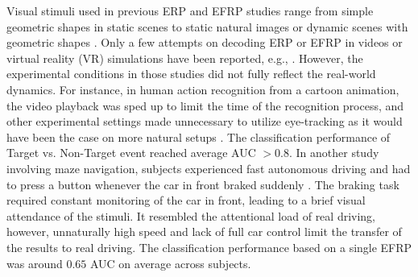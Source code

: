 \documentclass[12pt]{iopart}
\begin{document}
Visual stimuli used in previous ERP and EFRP studies range from simple geometric shapes
in static scenes to static natural images or dynamic
scenes with geometric shapes \cite{uscumlic_active_2016, devillez_p300_2015}.
Only a few attempts on decoding ERP or EFRP in videos or virtual reality (VR) simulations
have been reported, e.g., \cite{rosenthal_evoked_2014,jangraw_neurally_2014}. 
However, the experimental conditions in those studies did not fully
reflect the real-world dynamics.
For instance, in human action recognition from a cartoon animation, the video playback was sped up
to limit the time of the recognition process, and other experimental
settings made unnecessary to utilize eye-tracking 
as it would have been the case on more natural setups \cite{rosenthal_evoked_2014}.
The classification performance of Target vs. Non-Target event reached average AUC $> 0.8$.
In another study involving maze navigation, subjects experienced fast autonomous driving
and had to press a button whenever the car in front braked suddenly \cite{jangraw_neurally_2014}.
The braking task required constant monitoring of the car in front, leading
to a brief visual attendance of the stimuli. It resembled the attentional load
of real driving, however, unnaturally high speed and lack of full car control
limit the transfer of the results to real driving.
The classification performance based on a single EFRP 
was around $0.65$ AUC on average across subjects.

\end{document}
